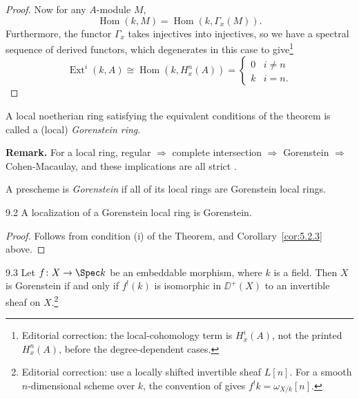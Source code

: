 \begin{proof}
Now for any $A$-module $M$,
\[
\operatorname{Hom}(k,M) = \operatorname{Hom}(k, \Gamma_{x}(M)).
\]
Furthermore, the functor $\Gamma_{x}$ takes injectives into injectives, so we have a spectral sequence of derived functors, which degenerates in this case to give\footnote{Editorial correction: the local-cohomology term is $H_x^i(A)$, not the printed $H_x^n(A)$, before the degree-dependent cases.}
\[
\operatorname{Ext}^{i}(k,A) \cong \operatorname{Hom}(k, H_{x}^{n}(A)) = \begin{cases} 0 & i\neq n \\ k & i = n. \end{cases}
\]
\end{proof}

\begin{definition*}
A local noetherian ring satisfying the equivalent conditions of the theorem is called a (local) \emph{Gorenstein ring}.
\end{definition*}

\par\medskip\noindent\textbf{Remark.}
For a local ring, regular $\Longrightarrow$ complete intersection $\Longrightarrow$ Gorenstein $\Longrightarrow$ Cohen-Macaulay, and these implications are all strict \cite{2}.
\par\medskip

\begin{definition*}
A prescheme is \emph{Gorenstein} if all of its local rings are Gorenstein local rings.
\end{definition*}

\begin{bookcorollary}{9.2}\label{cor:5.9.2}
A localization of a Gorenstein local ring is Gorenstein.
\end{bookcorollary}

\begin{proof}
Follows from condition (i) of the Theorem, and Corollary~\ref{cor:5.2.3} above.
\end{proof}

\begin{bookproposition}{9.3}\label{prop:5.9.3}
Let $f\colon X\to\Spec k$ be an embeddable morphism, where $k$ is a field. Then $X$ is Gorenstein if and only if $f^{!}(k)$ is isomorphic in $\DD^+(X)$ to an invertible sheaf on $X$.\footnote{Editorial correction: use a locally shifted invertible sheaf $L[n]$. For a smooth $n$-dimensional scheme over $k$, the convention of  gives $f^!k=\omega_{X/k}[n]$.}
\end{bookproposition}

